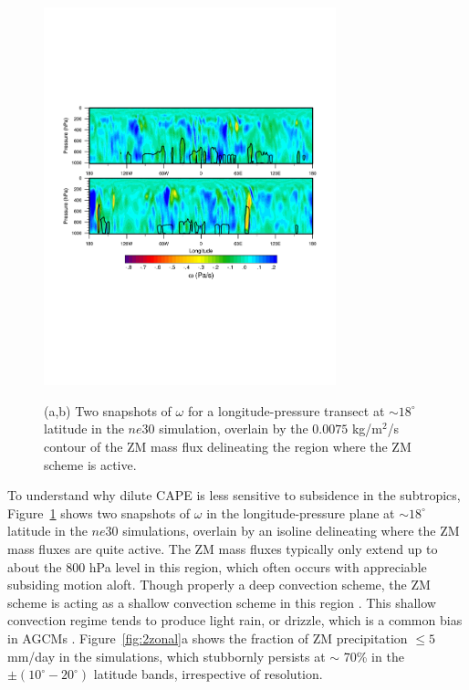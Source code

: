 \documentclass[alpha-refs]{wiley-article}
\begin{document}
\begin{figure}
\begin{center}
\noindent\includegraphics[width=20pc,angle=0]{figs/temp_trans.pdf}\\
\end{center}
\caption{(a,b) Two snapshots of $\omega$ for a longitude-pressure transect at $\sim 18^{\circ}$ latitude in the $ne30$ simulation, overlain by the $0.0075$ kg/m$^2$/s contour of the ZM mass flux delineating the region where the ZM scheme is active.}
\label{fig:transect}
\end{figure}

To understand why dilute CAPE is less sensitive to subsidence in the subtropics, Figure~\ref{fig:transect} shows two snapshots of $\omega$ in the longitude-pressure plane at  $\sim 18^{\circ}$ latitude in the $ne30$ simulations, overlain by an isoline delineating where the ZM mass fluxes are quite active. The ZM mass fluxes typically only extend up to about the 800 hPa level in this region, which often occurs with appreciable subsiding motion aloft. Though properly a deep convection scheme, the ZM scheme is acting as a shallow convection scheme in this region \citep{TETAL2016AGU}. This shallow convection regime tends to produce light rain, or drizzle, which is a common bias in AGCMs \citep{D2006JCLIM}. Figure~\ref{fig:2zonal}a shows the fraction of ZM precipitation $\leq 5$ mm/day in the simulations, which stubbornly persists at $\sim$ 70\% in the $\pm \left(10^{\circ}-20^{\circ} \right)$ latitude bands, irrespective of resolution.
\end{document}
